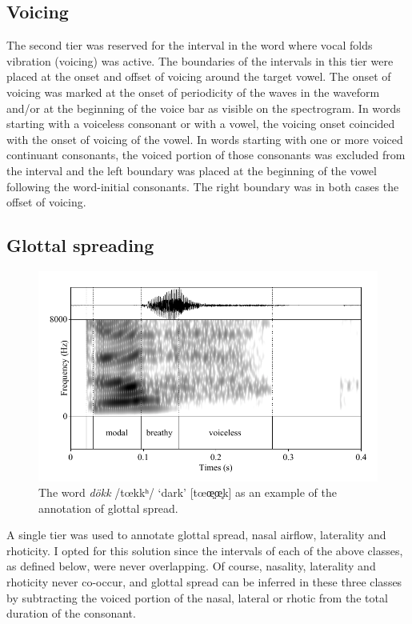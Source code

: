 \documentclass[11pt,a4paper,openany]{memoir}\usepackage[]{graphicx}\usepackage[]{color}
\begin{document}
\subsection{Voicing}

The second tier was reserved for the interval in the word where vocal folds vibration (voicing) was active.
The boundaries of the intervals in this tier were placed at the onset and offset of voicing around the target vowel.
The onset of voicing was marked at the onset of periodicity of the waves in the waveform and/or at the beginning of the voice bar as visible on the spectrogram.
In words starting with a voiceless consonant or with a vowel, the voicing onset coincided with the onset of voicing of the vowel.
In words starting with one or more voiced continuant consonants, the voiced portion of those consonants was excluded from the interval and the left boundary was placed at the beginning of the vowel following the word-initial consonants.
The right boundary was in both cases the offset of voicing.

\subsection{Glottal spreading}

\begin{figure}
\centering
\includegraphics[width=\textwidth]{dokk}
\caption{The word \textit{dökk} /tœkkʰ/ `dark' [tœœ̤̤œ̥k] as an example of the annotation of glottal spread.}
\label{f:glottal}
\end{figure}


A single tier was used to annotate glottal spread, nasal airflow, laterality and rhoticity.
I opted for this solution since the intervals of each of the above classes, as defined below, were never overlapping.
Of course, nasality, laterality and rhoticity never co-occur, and glottal spread can be inferred in these three classes by subtracting the voiced portion of the nasal, lateral or rhotic from the total duration of the consonant.
\end{document}
